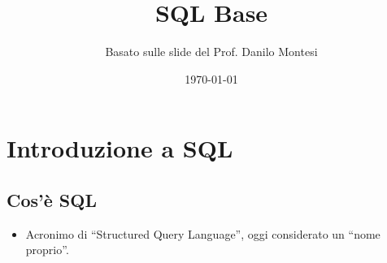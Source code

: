 

\usepackage{hyperref}


\newcommand{\Rel}[1]{\textit{#1}} %
\newcommand{\Attr}[1]{\textsf{#1}} %

\newcommand{\myunion}{\cup}
\newcommand{\myintersection}{\cap}
\newcommand{\mydifference}{-}
\newcommand{\myrename}[2]{\rho_{#1}(#2)}
\newcommand{\myselectop}[2]{\sigma_{#1}(#2)}
\newcommand{\myproject}[2]{\pi_{#1}(#2)}
\newcommand{\mycartesian}{\times}
\newcommand{\mynaturaljoin}{\bowtie}
\newcommand{\mythetajoin}[3]{#1 \bowtie_{#2} #3}

\newcommand{\mylandop}{\wedge}
\newcommand{\myvel}{\vee}
\newcommand{\mynegop}{\neg}
\newcommand{\myforallop}{\forall}
\newcommand{\myexistsop}{\exists}

\def\ojoin{\setbox0=\hbox{$\mynaturaljoin$}%
	\rule[-.02ex]{.25em}{.4pt}\llap{\rule[\ht0]{.25em}{.4pt}}}
\newcommand{\myleftouterjoin}{\mathbin{\ojoin\mkern-5.8mu\mynaturaljoin}}
\newcommand{\myrightouterjoin}{\mathbin{\mynaturaljoin\mkern-5.8mu\ojoin}}
\newcommand{\myfullouterjoin}{\mathbin{\ojoin\mkern-5.8mu\mynaturaljoin\mkern-5.8mu\ojoin}}


\title{SQL Base}
\author{Basato sulle slide del Prof. Danilo Montesi}
\date{\today}


	
	\maketitle
	\tableofcontents
	\newpage
	
	\section{Introduzione a SQL}
	
	\subsection{Cos'è SQL}
	\begin{itemize}
		\item Acronimo di ``Structured Query Language'', oggi considerato un ``nome proprio''.
	\end{itemize}
	

